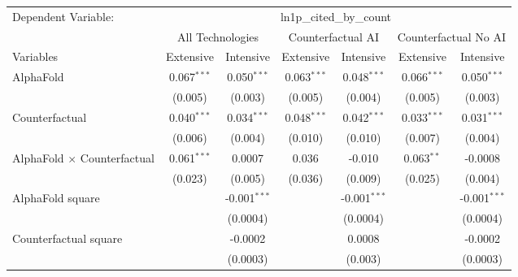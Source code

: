 \begingroup
\centering
\begin{tabular}{lcccccc}
   \tabularnewline \midrule \midrule
   Dependent Variable: & \multicolumn{6}{c}{ln1p\_cited\_by\_count}\\
 & \multicolumn{2}{c}{All Technologies} & \multicolumn{2}{c}{Counterfactual AI} & \multicolumn{2}{c}{Counterfactual No AI} \\
\cmidrule(lr){1-1}\cmidrule(lr){2-3} \cmidrule(lr){4-5} \cmidrule(lr){6-7}
Variables & \multicolumn{1}{c}{Extensive} & \multicolumn{1}{c}{Intensive} & \multicolumn{1}{c}{Extensive} & \multicolumn{1}{c}{Intensive} & \multicolumn{1}{c}{Extensive} & \multicolumn{1}{c}{Intensive} \\
\cmidrule(lr){1-1}\cmidrule(lr){2-2} \cmidrule(lr){3-3} \cmidrule(lr){4-4} \cmidrule(lr){5-5} \cmidrule(lr){6-6} \cmidrule(lr){7-7}
   AlphaFold                          & 0.067$^{***}$ & 0.050$^{***}$  & 0.063$^{***}$ & 0.048$^{***}$  & 0.066$^{***}$ & 0.050$^{***}$\\   
                                      & (0.005)       & (0.003)        & (0.005)       & (0.004)        & (0.005)       & (0.003)\\   
   Counterfactual                     & 0.040$^{***}$ & 0.034$^{***}$  & 0.048$^{***}$ & 0.042$^{***}$  & 0.033$^{***}$ & 0.031$^{***}$\\   
                                      & (0.006)       & (0.004)        & (0.010)       & (0.010)        & (0.007)       & (0.004)\\   
   AlphaFold $\times$ Counterfactual  & 0.061$^{***}$ & 0.0007         & 0.036         & -0.010         & 0.063$^{**}$  & -0.0008\\   
                                      & (0.023)       & (0.005)        & (0.036)       & (0.009)        & (0.025)       & (0.004)\\   
   AlphaFold square                   &               & -0.001$^{***}$ &               & -0.001$^{***}$ &               & -0.001$^{***}$\\   
                                      &               & (0.0004)       &               & (0.0004)       &               & (0.0004)\\   
   Counterfactual square              &               & -0.0002        &               & 0.0008         &               & -0.0002\\   
                                      &               & (0.0003)       &               & (0.003)        &               & (0.0003)\\   

\end{tabular}

